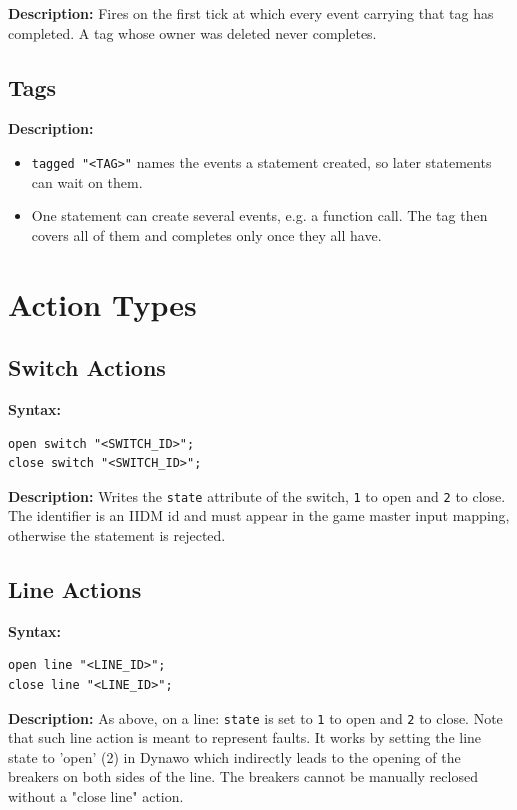 \documentclass[12pt]{article}
\begin{document}
\textbf{Description:} Fires on the first tick at which every event carrying that tag has completed. A tag whose owner was deleted never completes.

\subsection{Tags}

\textbf{Description:}
\begin{itemize}
  \item \texttt{tagged "<TAG>"} names the events a statement created, so later statements can wait on them.
  \item One statement can create several events, e.g. a function call. The tag then covers all of them and completes only once they all have.
\end{itemize}

\section{Action Types}

\subsection{Switch Actions}

\textbf{Syntax:}
\begin{lstlisting}
open switch "<SWITCH_ID>";
close switch "<SWITCH_ID>";
\end{lstlisting}

\textbf{Description:} Writes the \texttt{state} attribute of the switch, \texttt{1} to open and \texttt{2} to close. The identifier is an IIDM id and must appear in the game master input mapping, otherwise the statement is rejected.

\subsection{Line Actions}

\textbf{Syntax:}
\begin{lstlisting}
open line "<LINE_ID>";
close line "<LINE_ID>";
\end{lstlisting}

\textbf{Description:} As above, on a line: \texttt{state} is set to \texttt{1} to open and \texttt{2} to close. Note that such line action is meant to represent faults. It works by setting the line state to 'open' (2) in Dynawo which indirectly leads to the opening of the breakers on both sides of the line. The breakers cannot be manually reclosed without a "close line" action.
\end{document}
